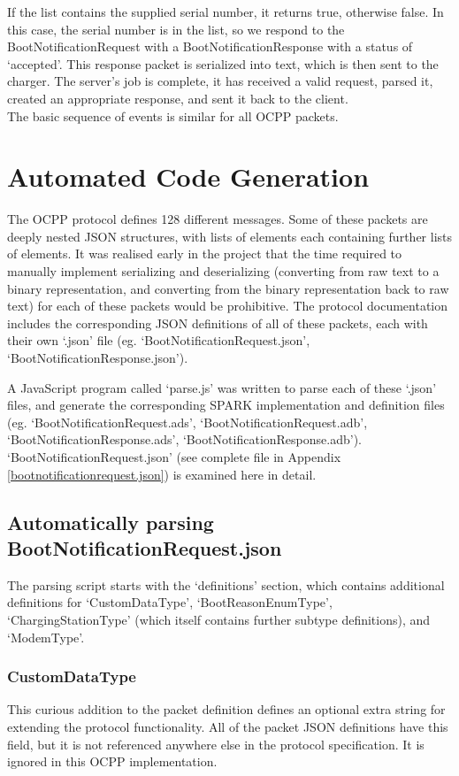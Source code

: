 \documentclass[12pt,openany,a4paper]{book}
\begin{document}
If the list contains the supplied serial number, it returns true, otherwise false. In this case, the serial number is in the list, so we respond to the BootNotificationRequest with a BootNotificationResponse with a status of `accepted'. This response packet is serialized into text, which is then sent to the charger. The server's job is complete, it has received a valid request, parsed it, created an appropriate response, and sent it back to the client.\\

The basic sequence of events is similar for all OCPP packets.

\section{Automated Code Generation}

The OCPP protocol defines 128 different messages. Some of these packets are deeply nested JSON structures, with lists of elements each containing further lists of elements. It was realised early in the project that the time required to manually implement serializing and deserializing (converting from raw text to a binary representation, and converting from the binary representation back to raw text) for each of these packets would be prohibitive. The protocol documentation includes the corresponding JSON definitions of all of these packets, each with their own `.json' file (eg. `BootNotificationRequest.json', `BootNotificationResponse.json').

A JavaScript program called `parse.js' was written to parse each of these `.json' files, and generate the corresponding SPARK implementation and definition files (eg. `BootNotificationRequest.ads', `BootNotificationRequest.adb', `BootNotificationResponse.ads', `BootNotificationResponse.adb'). `BootNotificationRequest.json' (see complete file in Appendix \ref{bootnotificationrequest.json}) is examined here in detail.

\subsection{Automatically parsing BootNotificationRequest.json}
The parsing script starts with the `definitions' section, which contains additional definitions for `CustomDataType', `BootReasonEnumType', `ChargingStationType' (which itself contains further subtype definitions), and `ModemType'.

\subsubsection{CustomDataType}
This curious addition to the packet definition defines an optional extra string for extending the protocol functionality. All of the packet JSON definitions have this field, but it is not referenced anywhere else in the protocol specification. It is ignored in this OCPP implementation.
\end{document}
